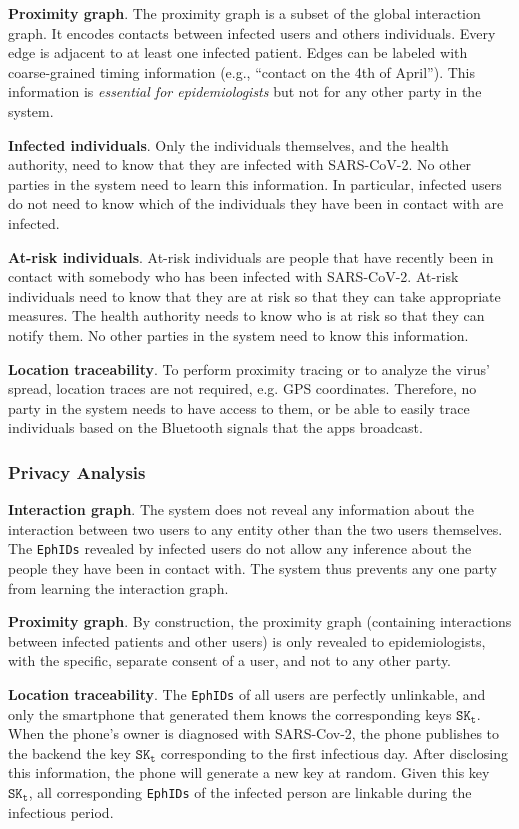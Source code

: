 \documentclass[12pt,a4paper]{article}
\begin{document}
\textbf{Proximity graph}. The proximity graph is a subset of the global interaction graph. It encodes contacts between infected users and others individuals. Every edge is adjacent to at least one infected patient. Edges can be labeled with coarse-grained timing information (e.g., “contact on the 4th of April”). This information is \textit{essential for epidemiologists} but not for any other party in the system.

\textbf{Infected individuals}. Only the individuals themselves, and the health authority, need to know that they are infected with SARS-CoV-2. No other parties in the system need to learn this information. In particular, infected users do not need to know which of the individuals they have been in contact with are infected.

\textbf{At-risk individuals}. At-risk individuals are people that have recently been in contact with somebody who has been infected with SARS-CoV-2. At-risk individuals need to know that they are at risk so that they can take appropriate measures. The health authority needs to know who is at risk so that they can notify them. No other parties in the system need to know this information.

\textbf{Location traceability}. To perform proximity tracing or to analyze the virus’ spread, location traces are not required, e.g. GPS coordinates. Therefore, no party in the system needs to have access to them, or be able to easily trace individuals based on the Bluetooth signals that the apps broadcast.
\subsubsection*{Privacy Analysis}
\textbf{Interaction graph}. The system does not reveal any information about the interaction between two users to any entity other than the two users themselves. The \texttt{EphIDs} revealed by infected users do not allow any inference about the people they have been in contact with. The system thus prevents any one party from learning the interaction graph.

\textbf{Proximity graph}. By construction, the proximity graph (containing interactions between infected patients and other users) is only revealed to epidemiologists, with the specific, separate consent of a user, and not to any other party.

\textbf{Location traceability}. The \texttt{EphIDs} of all users are perfectly unlinkable, and only the smartphone that generated them knows the corresponding keys $\texttt{SK}_\texttt{t}$. When the phone’s owner is diagnosed with SARS-Cov-2, the phone publishes to the backend the key $\texttt{SK}_\texttt{t}$ corresponding to the first infectious day. After disclosing this information, the phone will generate a new key at random. Given this key $\texttt{SK}_\texttt{t}$, all corresponding \texttt{EphIDs} of the infected person are linkable during the infectious period.
\end{document}
